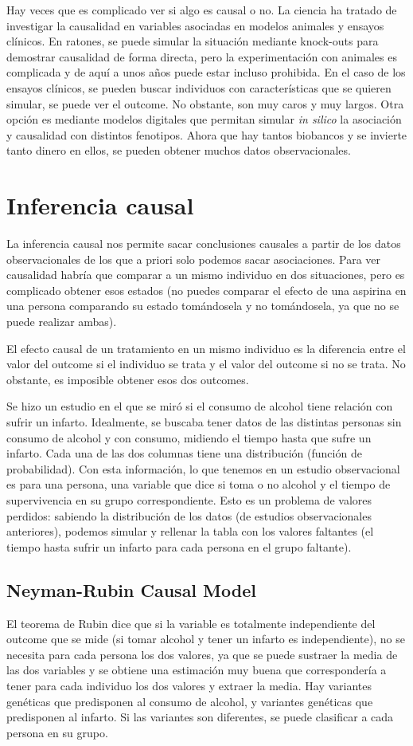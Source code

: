 Hay veces que es complicado ver si algo es causal o no. La ciencia ha tratado de investigar la causalidad en variables asociadas en modelos animales y ensayos clínicos. En ratones, se puede simular la situación mediante knock-outs para demostrar causalidad de forma directa, pero la experimentación con animales es complicada y de aquí a unos años puede estar incluso prohibida. En el caso de los ensayos clínicos, se pueden buscar individuos con características que se quieren simular, se puede ver el outcome. No obstante, son muy caros y muy largos. Otra opción es mediante modelos digitales que permitan simular \textit{in silico} la asociación y causalidad con distintos fenotipos. Ahora que hay tantos biobancos y se invierte tanto dinero en ellos, se pueden obtener muchos datos observacionales. 

\section{Inferencia causal}
La inferencia causal nos permite sacar conclusiones causales a partir de los datos observacionales de los que a priori solo podemos sacar asociaciones. Para ver causalidad habría que comparar a un mismo individuo en dos situaciones, pero es complicado obtener esos estados (no puedes comparar el efecto de una aspirina en una persona comparando su estado tomándosela y no tomándosela, ya que no se puede realizar ambas). 

El efecto causal de un tratamiento en un mismo individuo es la diferencia entre el valor del outcome si el individuo se trata y el valor del outcome si no se trata. No obstante, es imposible obtener esos dos outcomes. 

Se hizo un estudio en el que se miró si el consumo de alcohol tiene relación con sufrir un infarto. Idealmente, se buscaba tener datos de las distintas personas sin consumo de alcohol y con consumo, midiendo el tiempo hasta que sufre un infarto. Cada una de las dos columnas tiene una distribución (función de probabilidad). Con esta información, lo que tenemos en un estudio observacional es para una persona, una variable que dice si toma o no alcohol y el tiempo de supervivencia en su grupo correspondiente. Esto es un problema de valores perdidos: sabiendo la distribución de los datos (de estudios observacionales anteriores), podemos simular y rellenar la tabla con los valores faltantes (el tiempo hasta sufrir un infarto para cada persona en el grupo faltante).

\subsection{Neyman-Rubin Causal Model}
El teorema de Rubin dice que si la variable es totalmente independiente del outcome que se mide (si tomar alcohol y tener un infarto es independiente), no se necesita para cada persona los dos valores, ya que se puede sustraer la media de las dos variables y se obtiene una estimación muy buena que correspondería a tener para cada individuo los dos valores y extraer la media. Hay variantes genéticas que predisponen al consumo de alcohol, y variantes genéticas que predisponen al infarto. Si las variantes son diferentes, se puede clasificar a cada persona en su grupo.

